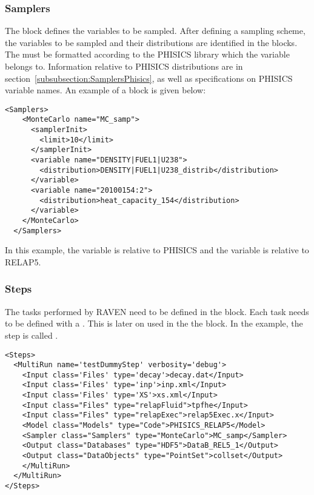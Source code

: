 \subsubsection{Samplers}\label{SamplerPhisicsRelap5}
The  block defines the variables to be sampled.
After defining a sampling scheme, the variables to be sampled and
their distributions are identified in the  blocks.
The  must be formatted according to the PHISICS library which the variable belongs to.
Information relative to PHISICS distributions are in section~\ref{subsubsection:SamplersPhisics},
as well as specifications on PHISICS variable names.
An example of a  block is given below:
\begin{lstlisting}[style=XML]
 <Samplers>
    <MonteCarlo name="MC_samp">
      <samplerInit>
        <limit>10</limit>
      </samplerInit>
      <variable name="DENSITY|FUEL1|U238">
        <distribution>DENSITY|FUEL1|U238_distrib</distribution>
      </variable>
      <variable name="20100154:2">
        <distribution>heat_capacity_154</distribution>
      </variable>
    </MonteCarlo>
  </Samplers>
\end{lstlisting}
In this example, the variable  is relative to PHISICS and the variable  is relative to RELAP5.
\subsubsection{Steps}
The tasks performed by RAVEN need to be defined in the  block. Each task needs to be defined with a . This  is later on used in the
the  block. In the example, the step is called .
%
\begin{lstlisting}[style=XML]
<Steps>
  <MultiRun name='testDummyStep' verbosity='debug'>
    <Input class='Files' type='decay'>decay.dat</Input>
    <Input class='Files' type='inp'>inp.xml</Input>
    <Input class='Files' type='XS'>xs.xml</Input>
    <Input class="Files" type="relapFluid">tpfhe</Input>
    <Input class="Files" type="relapExec">relap5Exec.x</Input>
    <Model class="Models" type="Code">PHISICS_RELAP5</Model>
    <Sampler class="Samplers" type="MonteCarlo">MC_samp</Sampler>
    <Output class="Databases" type="HDF5">DataB_REL5_1</Output>
    <Output class="DataObjects" type="PointSet">collset</Output>
    </MultiRun>
  </MultiRun>
</Steps>
\end{lstlisting}
%
